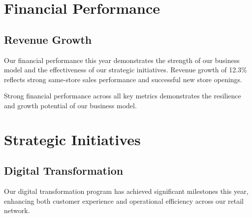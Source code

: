 \documentclass{dollarama}
\begin{document}
\section{Financial Performance}

\subsection{Revenue Growth}

Our financial performance this year demonstrates the strength of our business model and the effectiveness of our strategic initiatives. Revenue growth of 12.3\% reflects strong same-store sales performance and successful new store openings.

\begin{dollaramafinancials}{
    Strong financial performance across all key metrics demonstrates the resilience and growth potential of our business model.
}
\end{dollaramafinancials}


\clearpage



\section{Strategic Initiatives}

\subsection{Digital Transformation}

Our digital transformation program has achieved significant milestones this year, enhancing both customer experience and operational efficiency across our retail network.
\end{document}
